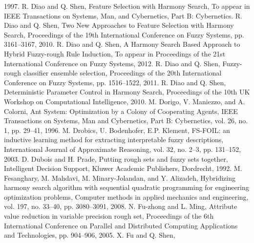 1997.
R. Diao and Q. Shen,
Feature Selection with Harmony Search,
To appear in IEEE Transactions on Systems, Man, and Cybernetics, Part B: Cybernetics.
R. Diao and Q. Shen,
Two New Approaches to Feature Selection with Harmony Search,
Proceedings of the 19th International Conference on Fuzzy Systems,
pp. 3161--3167,
2010.
R. Diao and Q. Shen,
A Harmony Search Based Approach to Hybrid Fuzzy-rough Rule Induction,
To appear in Proceedings of the 21st International Conference on Fuzzy Systems,
2012.
R. Diao and Q. Shen,
Fuzzy-rough classifier ensemble selection,
Proceedings of the 20th International Conference on Fuzzy Systems,
pp. 1516--1522,
2011.
R. Diao and Q. Shen,
Deterministic Parameter Control in Harmony Search,
Proceedings of the 10th UK Workshop on Computational Intelligence,
2010.
M. Dorigo, V. Maniezzo, and A. Colorni,
Ant System: Optimization by a Colony of Cooperating Agents,
IEEE Transactions on Systems, Man and Cybernetics, Part B: Cybernetics,
vol. 26, no. 1, pp. 29--41,
1996.
M. Drobics, U. Bodenhofer, E.P. Klement,
FS-FOIL: an inductive learning method for extracting interpretable fuzzy descriptions,
International Journal of Approximate Reasoning,
vol. 32, no. 2--3, pp. 131--152,
2003.
D. Dubois and H. Prade,
Putting rough sets and fuzzy sets together,
Intelligent Decision Support, Kluwer Academic Publishers, Dordrecht,
1992.
M. Fesanghary, M. Mahdavi, M. Minary-Jolandan, and Y. Alizadeh,
Hybridizing harmony search algorithm with sequential quadratic programming for engineering optimization problems,
Computer methods in applied mechanics and engineering,
vol. 197, no. 33--40, pp. 3080--3091,
2008.
N. Fu-zhong and L. Ming,
Attribute value reduction in variable precision rough set,
Proceedings of the 6th International Conference on Parallel and Distributed Computing Applications and Technologies,
pp. 904--906,
2005.
X. Fu and Q. Shen,
